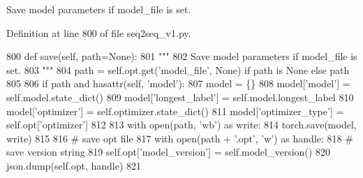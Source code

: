 \begin{DoxyVerb}Save model parameters if model_file is set.
\end{DoxyVerb}
 

Definition at line 800 of file seq2seq\+\_\+v1.\+py.


\begin{DoxyCode}
800     \textcolor{keyword}{def }save(self, path=None):
801         \textcolor{stringliteral}{"""}
802 \textcolor{stringliteral}{        Save model parameters if model\_file is set.}
803 \textcolor{stringliteral}{        """}
804         path = self.opt.get(\textcolor{stringliteral}{'model\_file'}, \textcolor{keywordtype}{None}) \textcolor{keywordflow}{if} path \textcolor{keywordflow}{is} \textcolor{keywordtype}{None} \textcolor{keywordflow}{else} path
805 
806         \textcolor{keywordflow}{if} path \textcolor{keywordflow}{and} hasattr(self, \textcolor{stringliteral}{'model'}):
807             model = \{\}
808             model[\textcolor{stringliteral}{'model'}] = self.model.state\_dict()
809             model[\textcolor{stringliteral}{'longest\_label'}] = self.model.longest\_label
810             model[\textcolor{stringliteral}{'optimizer'}] = self.optimizer.state\_dict()
811             model[\textcolor{stringliteral}{'optimizer\_type'}] = self.opt[\textcolor{stringliteral}{'optimizer'}]
812 
813             with open(path, \textcolor{stringliteral}{'wb'}) \textcolor{keyword}{as} write:
814                 torch.save(model, write)
815 
816             \textcolor{comment}{# save opt file}
817             with open(path + \textcolor{stringliteral}{'.opt'}, \textcolor{stringliteral}{'w'}) \textcolor{keyword}{as} handle:
818                 \textcolor{comment}{# save version string}
819                 self.opt[\textcolor{stringliteral}{'model\_version'}] = self.model\_version()
820                 json.dump(self.opt, handle)
821 
\end{DoxyCode}
\mbox{\label{classparlai_1_1agents_1_1legacy__agents_1_1seq2seq_1_1seq2seq__v1_1_1Seq2seqAgent_afb99f50cbac1707480d1953163d91018}} 
